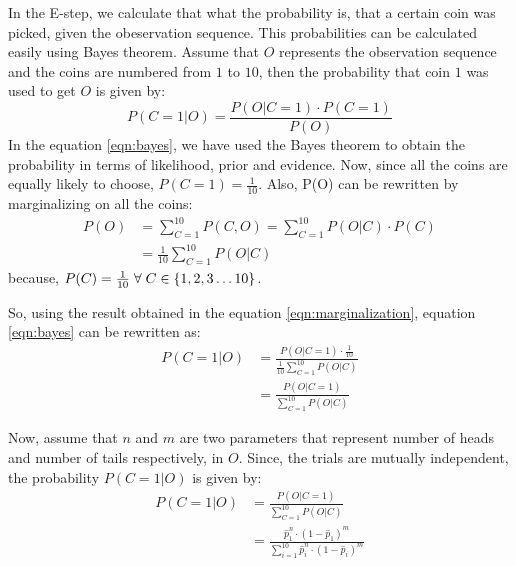 \documentclass[journal, compsoc]{IEEEtran}
\begin{document}
In the E-step, we calculate that what the probability is, that a certain coin was picked, given the obeservation sequence. This probabilities can be
calculated easily using Bayes theorem. Assume that $O$ represents the observation sequence and the coins are numbered from $1$ to $10$, then the
probability that coin $1$ was used to get $O$ is given by:
\begin{equation}
\label{eqn:bayes}
    P(C = 1 | O) = \frac{P(O | C = 1) \cdot P(C = 1)}{P(O)}
\end{equation}
In the equation \ref{eqn:bayes}, we have used the Bayes theorem to obtain the probability in terms of likelihood, prior and evidence. Now,
since all the coins are equally likely to choose, ${P(C = 1) = \frac{1}{10}}$. Also, P(O) can be rewritten by marginalizing on all the coins:
\begin{equation}
\label{eqn:marginalization}
\begin{aligned}
P(O) &= \sum_{C = 1}^{10} P(C, O) = \sum_{C = 1}^{10} P(O | C) \cdot P(C)\\
&= \frac{1}{10} \sum_{C = 1}^{10} P(O | C)
\end{aligned}
\end{equation}
because, ${P(C) = \frac{1}{10} \hspace{1mm} \forall \hspace{1mm} C \in \{1, 2, 3 \ldots 10\}}$.

So, using the result obtained in the equation \ref{eqn:marginalization}, equation \ref{eqn:bayes} can be rewritten as:
\begin{equation}
\label{eqn:final}
\begin{aligned}
P(C = 1 | O) &= \frac{P(O | C = 1) \cdot \frac{1}{10}}{\frac{1}{10}\sum_{C = 1}^{10} P(O | C)}\\
&= \frac{P(O | C = 1)}{\sum_{C = 1}^{10} P(O | C)}
\end{aligned}
\end{equation}

Now, assume that $n$ and $m$ are two parameters that represent number of heads and number of tails respectively, in $O$. Since, the trials are mutually
independent, the probability $P(C = 1 | O)$ is given by:
\begin{equation}
\label{eqn:finale}
\begin{aligned}
P(C = 1 | O) &= \frac{P(O | C = 1)}{\sum_{C = 1}^{10} P(O | C)}\\
&= \frac{\hat{p}_{1}^{n}\cdot (1 - \hat{p}_{1})^{m}}{\sum_{i = 1}^{10} \hat{p}_{i}^{n}\cdot (1 - \hat{p}_{i})^{m}}
\end{aligned}
\end{equation}
\end{document}
